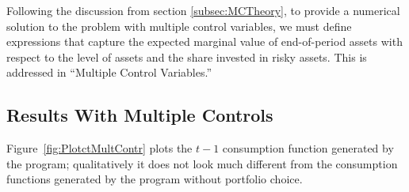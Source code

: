 \documentclass[titlepage, headings=optiontotocandhead]{Resources/texmf-local/tex/latex/econtex}
\begin{document}
Following the discussion from section \ref{subsec:MCTheory}, to provide a numerical solution to the problem
with multiple control variables, we must define expressions that capture the expected marginal value of end-of-period
assets with respect to the level of assets and the share invested in risky assets. This is addressed in ``Multiple Control Variables.''





\hypertarget{results-with-multiple-controls}{}
\subsection{Results With Multiple Controls}\label{subsec:results-with-multiple-controls}

Figure~\ref{fig:PlotctMultContr} plots the $t-1$ consumption function generated by the program; qualitatively it does not look much different from the consumption functions generated by the program without portfolio choice.
\end{document}
